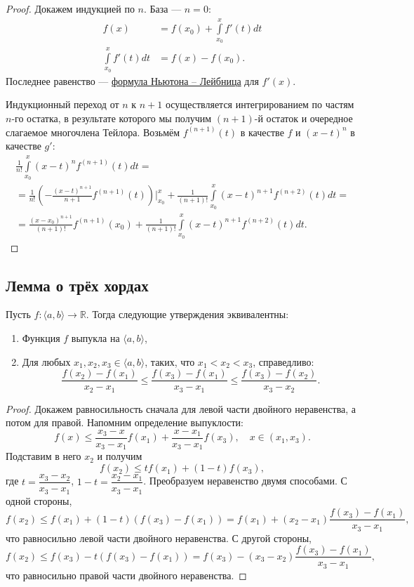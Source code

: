 \begin{proof}
	Докажем индукцией по \(n\). База ---  \(n = 0\):
	\begin{align*}
		f(x) &= f(x_0) + \int\limits_{x_0}^x f'(t) dt \\
		\int\limits_{x_0}^x f'(t) dt &= f(x) - f(x_0).
	\end{align*}
	Последнее равенство --- \hyperlink{t9}{формула Ньютона -- Лейбница} для \(f'(x)\).
	
	Индукционный переход от \(n\) к \(n + 1\) осуществляется интегрированием по частям \(n\)-го остатка, в результате которого мы получим \((n + 1)\)-й остаток и очередное слагаемое многочлена Тейлора. Возьмём \(f^{(n + 1)}(t)\) в качестве \(f\) и \((x - t)^n\)
	в качестве \(g'\):
	\begin{multline*}
		\frac{1}{n!} \int\limits_{x_0}^x (x - t)^n f^{(n + 1)}(t) dt = \\
		 = \frac{1}{n!} \left(-\frac{(x - t)^{n + 1}}{n + 1} f^{(n + 1)}(t)\right) \bigg|_{x_0}^x + \frac{1}{(n + 1)!} \int\limits_{x_0}^x (x - t)^{n + 1} f^{(n + 2)}(t) dt = \\
		 = \frac{(x - x_0)^{n + 1}}{(n + 1)!} f^{(n + 1)}(x_0)
		+ \frac{1}{(n + 1)!} \int\limits_{x_0}^x (x - t)^{n + 1} f^{(n + 2)}(t) dt.
	\end{multline*}
\end{proof}

\subsection{Лемма о трёх хордах}

\hypertarget{trihordy}{}
\begin{theorem}
	Пусть \(f \colon \langle a, b \rangle \to \mathbb{R}\). Тогда следующие утверждения эквивалентны:
	\begin{enumerate}
		\item Функция \(f\) выпукла на \(\langle a, b \rangle\),
		\item Для любых \(x_1, x_2, x_3 \in \langle a, b \rangle\), таких, что \(x_1 < x_2 < x_3\), справедливо: \[
		\frac{f(x_2) - f(x_1)}{x_2 - x_1} \leqslant \frac{f(x_3) - f(x_1)}{x_3 - x_1} \leqslant \frac{f(x_3) - f(x_2)}{x_3 - x_2}.
		\]
	\end{enumerate}
\end{theorem}

\begin{proof}
	Докажем равносильность сначала для левой части двойного неравенства, а потом для правой.
	Напомним определение выпуклости: \[
		f(x) \leqslant \frac{x_3 - x}{x_3 - x_1} f(x_1) + \frac{x - x_1}{x_3 - x_1} f(x_3), \quad x \in (x_1, x_3).
	\]
	Подставим в него \(x_2\) и получим \[
		f(x_2) \leqslant t f(x_1) + (1 - t) f(x_3),
	\]
	где \(t = \dfrac{x_3 - x_2}{x_3 - x_1}\), \(1 - t = \dfrac{x_2 - x_1}{x_3 - x_1}\).
	Преобразуем неравенство двумя способами. С одной стороны, \[
		f(x_2) \leqslant f(x_1) + (1 - t)(f(x_3) - f(x_1)) = f(x_1) + (x_2 - x_1) \frac{f(x_3) - f(x_1)}{x_3 - x_1},
	\]
	что равносильно левой части двойного неравенства. С другой стороны, \[
		f(x_2) \leqslant f(x_3) - t (f(x_3) - f(x_1)) = f(x_3) - (x_3 - x_2) \frac{f(x_3) - f(x_1)}{x_3 - x_1},
	\] что равносильно правой части двойного неравенства.
\end{proof}

